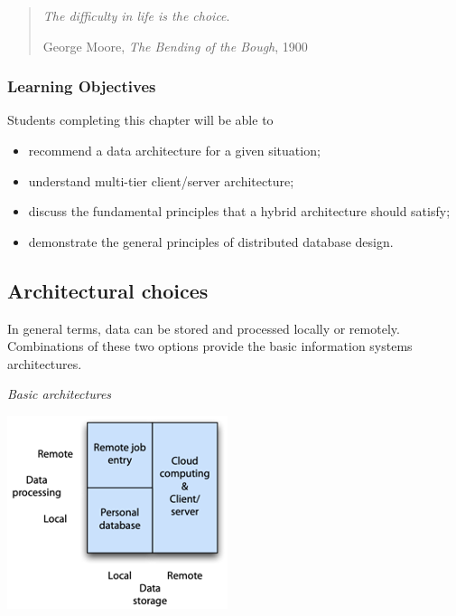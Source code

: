 \documentclass[
]{article}
\begin{document}
\begin{quote}
\emph{The difficulty in life is the choice}.

George Moore, \emph{The Bending of the Bough}, 1900
\end{quote}

\hypertarget{learning-objectives-12}{%
\subsubsection*{Learning Objectives}\label{learning-objectives-12}}

Students completing this chapter will be able to

\begin{itemize}
\item
  recommend a data architecture for a given situation;
\item
  understand multi-tier client/server architecture;
\item
  discuss the fundamental principles that a hybrid architecture should
  satisfy;
\item
  demonstrate the general principles of distributed database design.
\end{itemize}

\hypertarget{architectural-choices}{%
\subsection*{Architectural choices}\label{architectural-choices}}

In general terms, data can be stored and processed locally or remotely.
Combinations of these two options provide the basic information systems
architectures.

\emph{Basic architectures}

\includegraphics{Figures/Chapter 21/basic-architectures.png}
\end{document}
